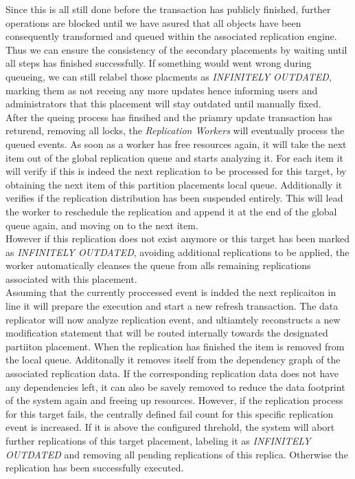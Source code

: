 Since this is all still done before the transaction has publicly finished, further operations are blocked until we have asured that all objects have been consequently transformed and queued within
the associated replication engine. Thus we can ensure the consistency of the secondary placements by waiting until all steps has finished successfully. If something would 
went wrong during queueing, we can still relabel those placments as \emph{INFINITELY OUTDATED}, marking them as not receing any more updates hence informing users and administrators
that this placement will stay outdated until manually fixed.\\

After the queing process has finsihed and the priamry update transaction has returend, removing all locks, the \emph{Replication Workers} will eventually process the queued events.
As soon as a worker has free resources again, it will take the next item out of the global replication queue and starts analyzing it.
For each item it will verify if this is indeed the next replication to be processed for this target, by obtaining the next item of this partition placements local queue.
Additionally it verifies if the replication distribution has been suspended entirely. This will lead the worker to reschedule the replication
and append it at the end of the global queue again, and moving on to the next item.\\
However if this replication does not exist anymore or this target has been marked as \emph{INFINITELY OUTDATED}, avoiding additional replications to be applied,
the worker automatically cleanses the queue from alls remaining replications associated with this placement.\\
Assuming that the currently proccessed event is indded the next replicaiton in line it will prepare the execution and start a new refresh transaction. 
The data replicator will now analyze replication event, and ultiamtely reconstructs a new modification statement that will be routed internally towards the designated partiiton placement.
When the replication has finished the item is removed from the local queue. Additonally it removes itself from the dependency graph of the associated replication data.
If the corresponding replication data does not have any dependencies left, it can also be savely removed to reduce the data footprint of the system again and freeing up resources.
However, if the replication process for this target fails, the centrally defined fail count for this specific replication event is increased. If it is above the configured threhold,
the system will abort further replications of this target placement, labeling it as \emph{INFINITELY OUTDATED} and removing all pending replications of this replica.
Otherwise the replication has been successfully executed.\\


